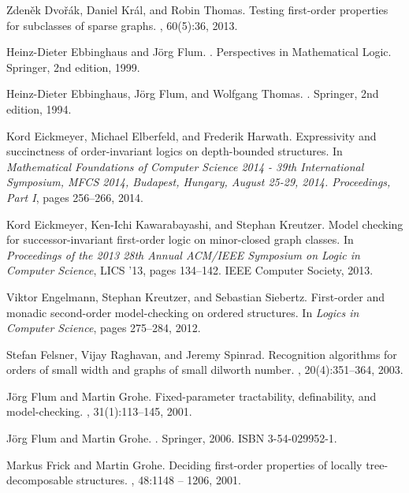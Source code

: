 \documentclass[12pt]{amsart}
\begin{document}
\begin{thebibliography}{10}
Zden{\v{e}}k Dvo{\v{r}}{\'a}k, Daniel Kr{\'a}l, and Robin Thomas.
\newblock Testing first-order properties for subclasses of sparse graphs.
, 60(5):36, 2013.

Heinz-Dieter Ebbinghaus and Jörg Flum.
.
\newblock Perspectives in Mathematical Logic. Springer, 2nd edition, 1999.

Heinz-Dieter Ebbinghaus, Jörg Flum, and Wolfgang Thomas.
.
\newblock Springer, 2nd edition, 1994.

Kord Eickmeyer, Michael Elberfeld, and Frederik Harwath.
\newblock Expressivity and succinctness of order-invariant logics on
  depth-bounded structures.
\newblock In {\em Mathematical Foundations of Computer Science 2014 - 39th
  International Symposium, {MFCS} 2014, Budapest, Hungary, August 25-29, 2014.
  Proceedings, Part {I}}, pages 256--266, 2014.

Kord Eickmeyer, Ken-Ichi Kawarabayashi, and Stephan Kreutzer.
\newblock Model checking for successor-invariant first-order logic on
  minor-closed graph classes.
\newblock In {\em Proceedings of the 2013 28th Annual ACM/IEEE Symposium on
  Logic in Computer Science}, LICS '13, pages 134--142. IEEE Computer Society,
  2013.

Viktor Engelmann, Stephan Kreutzer, and Sebastian Siebertz.
\newblock First-order and monadic second-order model-checking on ordered
  structures.
\newblock In {\em Logics in Computer Science}, pages 275--284, 2012.

Stefan Felsner, Vijay Raghavan, and Jeremy Spinrad.
\newblock Recognition algorithms for orders of small width and graphs of small
  dilworth number.
, 20(4):351--364, 2003.

J{\"o}rg Flum and Martin Grohe.
\newblock Fixed-parameter tractability, definability, and model-checking.
, 31(1):113--145, 2001.

Jörg Flum and Martin Grohe.
.
\newblock Springer, 2006.
\newblock ISBN 3-54-029952-1.

Markus Frick and Martin Grohe.
\newblock Deciding first-order properties of locally tree-decomposable
  structures.
, 48:1148 -- 1206, 2001.


\end{thebibliography}
\end{document}
